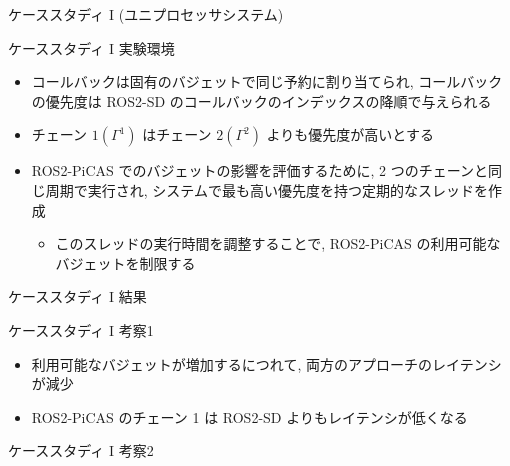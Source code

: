 \begin{frame}{ケーススタディ I (ユニプロセッサシステム)}
\end{frame}

\begin{frame}{ケーススタディ I 実験環境}
    \begin{itemize}
        \item コールバックは固有のバジェットで同じ予約に割り当てられ, コールバックの優先度は ROS2-SD のコールバックのインデックスの降順で与えられる
        \item チェーン $1\left(\Gamma^{1}\right)$ はチェーン $2\left(\Gamma^{2}\right)$ よりも優先度が高いとする
        \item ROS2-PiCAS でのバジェットの影響を評価するために, 2 つのチェーンと同じ周期で実行され, システムで最も高い優先度を持つ定期的なスレッドを作成
              \begin{itemize}
                  \item このスレッドの実行時間を調整することで, ROS2-PiCAS の利用可能なバジェットを制限する
              \end{itemize}
    \end{itemize}
\end{frame}

\begin{frame}{ケーススタディ I 結果}
\end{frame}

\begin{frame}{ケーススタディ I 考察1}
    \begin{itemize}
        \item 利用可能なバジェットが増加するにつれて, 両方のアプローチのレイテンシが減少
        \item ROS2-PiCAS のチェーン 1 は ROS2-SD よりもレイテンシが低くなる
    \end{itemize}
\end{frame}

\begin{frame}{ケーススタディ I 考察2}
\end{frame}

